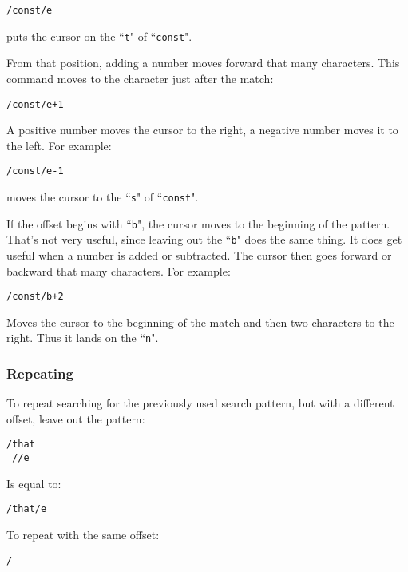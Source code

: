 \begin{Verbatim}[samepage=true]
 /const/e
\end{Verbatim}

puts the cursor on the ``\texttt{t}" of ``\texttt{const}".

From that position, adding a number moves forward that many characters.
This command moves to the character just after the match:

\begin{Verbatim}[samepage=true]
 /const/e+1
\end{Verbatim}

A positive number moves the cursor to the right, a negative number moves it to the left.
For example:

\begin{Verbatim}[samepage=true]
 /const/e-1
\end{Verbatim}

moves the cursor to the ``\texttt{s}" of ``\texttt{const}".

If the offset begins with ``\texttt{b}", the cursor moves to the beginning of the pattern.
That's not very useful, since leaving out the ``\texttt{b}" does the same thing.
It does get useful when a number is added or subtracted.
The cursor then goes forward or backward that many characters.
For example:

\begin{Verbatim}[samepage=true]
 /const/b+2
\end{Verbatim}

Moves the cursor to the beginning of the match and then two characters to the right.
Thus it lands on the ``\texttt{n}".

\subsubsection{Repeating}
To repeat searching for the previously used search pattern, but with a different offset, leave out the pattern:

\begin{Verbatim}[samepage=true]
 /that
 //e
\end{Verbatim}

Is equal to:

\begin{Verbatim}[samepage=true]
 /that/e
\end{Verbatim}

To repeat with the same offset:

\begin{Verbatim}[samepage=true]
 /
\end{Verbatim}

